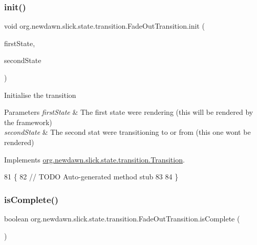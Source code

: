 \subsubsection{\texorpdfstring{init()}{init()}}
{\footnotesize\ttfamily void org.\+newdawn.\+slick.\+state.\+transition.\+Fade\+Out\+Transition.\+init (\begin{DoxyParamCaption}\item[{\mbox{\hyperlink{interfaceorg_1_1newdawn_1_1slick_1_1state_1_1_game_state}{Game\+State}}}]{first\+State,  }\item[{\mbox{\hyperlink{interfaceorg_1_1newdawn_1_1slick_1_1state_1_1_game_state}{Game\+State}}}]{second\+State }\end{DoxyParamCaption})\hspace{0.3cm}{\ttfamily [inline]}}

Initialise the transition


\begin{DoxyParams}{Parameters}
{\em first\+State} & The first state we\textquotesingle{}re rendering (this will be rendered by the framework) \\
\hline
{\em second\+State} & The second stat we\textquotesingle{}re transitioning to or from (this one won\textquotesingle{}t be rendered) \\
\hline
\end{DoxyParams}


Implements \mbox{\hyperlink{interfaceorg_1_1newdawn_1_1slick_1_1state_1_1transition_1_1_transition_a7b59f0c9205f1f0417ee18bc526e5b01}{org.\+newdawn.\+slick.\+state.\+transition.\+Transition}}.


\begin{DoxyCode}
81                                                                   \{
82         \textcolor{comment}{// TODO Auto-generated method stub}
83         
84     \}
\end{DoxyCode}
\mbox{\label{classorg_1_1newdawn_1_1slick_1_1state_1_1transition_1_1_fade_out_transition_a798425e8d39823af0dac48ab0831bad4}} 
\subsubsection{\texorpdfstring{is\+Complete()}{isComplete()}}
{\footnotesize\ttfamily boolean org.\+newdawn.\+slick.\+state.\+transition.\+Fade\+Out\+Transition.\+is\+Complete (\begin{DoxyParamCaption}{ }\end{DoxyParamCaption})\hspace{0.3cm}{\ttfamily [inline]}}

